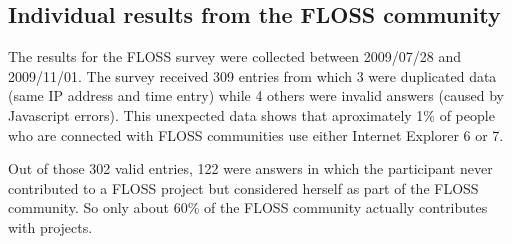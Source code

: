 \documentclass[lnbip]{svmultln}
\begin{document}
\subsection{Individual results from the FLOSS community}
\label{subsec:floss-results}

The results for the FLOSS survey were collected between 2009/07/28 and
2009/11/01. The survey received 309 entries from which 3 were
duplicated data (same IP address and time entry) while 4 others were
invalid answers (caused by Javascript errors). This unexpected data
shows that aproximately 1\% of people who are connected with FLOSS
communities use either Internet Explorer 6 or 7.

Out of those 302 valid entries, 122 were answers in which the
participant never contributed to a FLOSS project but considered
herself as part of the FLOSS community. So only about 60\% of the
FLOSS community actually contributes with projects.
\end{document}

